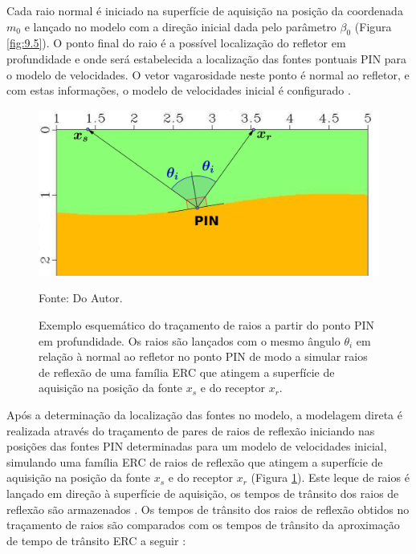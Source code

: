 Cada raio normal é iniciado na superfície de aquisição na posição da coordenada $m_0$ e lançado no modelo 
com a direção inicial dada pelo parâmetro $\beta_0$ (Figura \ref{fig:9.5}).
O ponto final do raio é a possível localização do refletor em profundidade
e onde será estabelecida a localização das fontes pontuais PIN para o modelo de velocidades.
O vetor vagarosidade neste ponto é
normal ao refletor, e com estas informações, o modelo de velocidades inicial é configurado \cite{niptomo}.

\begin{figure}[H]
\caption{Exemplo esquemático do traçamento de raios a partir do ponto PIN em profundidade.
Os raios são lançados com o mesmo ângulo $\theta_i$ em relação à normal ao refletor no ponto
PIN de modo a simular raios de reflexão de uma família ERC que atingem a superfície de aquisição
na posição da fonte $x_s$ e do receptor $x_r$.}
\begin{center}
\includegraphics[scale=0.5]{images/modelagem2.png}
\vspace{-0.3cm}
\end{center}
\begin{center}
 Fonte: Do Autor.
\end{center}
\label{fig:9.8}
\end{figure}

Após a determinação da localização das fontes no modelo,
a modelagem direta é realizada através do traçamento de pares de raios de reflexão
iniciando nas posições das fontes PIN determinadas para um modelo de velocidades
inicial,
simulando uma família ERC de raios de reflexão que atingem a superfície de aquisição
na posição da fonte $x_s$ e do receptor $x_r$ (Figura \ref{fig:9.8}).
Este leque de raios é lançado em direção à superfície de aquisição,
os tempos de trânsito dos raios de reflexão são armazenados \cite{stereo}.
Os tempos de trânsito dos raios de reflexão obtidos no traçamento de raios são comparados com os tempos
de trânsito da aproximação de tempo de trânsito ERC a seguir \cite{cre}:

